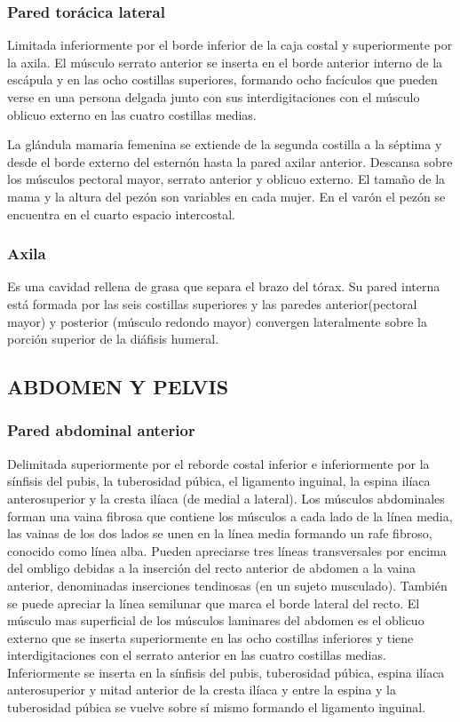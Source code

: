 \documentclass[a4paper,12pt]{article} %
\begin{document}
\begin{appendices}
\subsubsection{Pared torácica lateral}
Limitada inferiormente por el borde inferior de la caja costal y superiormente por la axila.
El músculo serrato anterior se inserta en el borde anterior interno de la escápula y en las ocho costillas superiores, formando ocho facículos que pueden verse en una persona delgada junto con sus interdigitaciones con el músculo oblicuo externo en las cuatro costillas medias.

La glándula mamaria femenina se extiende de la segunda costilla a la séptima y desde el borde externo del esternón hasta la pared axilar anterior. Descansa sobre los músculos  pectoral mayor, serrato anterior y oblicuo externo. El tamaño de la mama y la altura del pezón son variables en cada mujer. En el varón el pezón se encuentra en el cuarto espacio intercostal.
\subsubsection{Axila}
Es una cavidad rellena de grasa que separa el brazo del tórax. Su pared interna está formada por las seis costillas superiores y las paredes anterior(pectoral mayor) y posterior (músculo redondo mayor) convergen lateralmente sobre la porción superior de la diáfisis humeral.


\subsection{ABDOMEN Y PELVIS}

\subsubsection{Pared abdominal anterior}
Delimitada superiormente por el reborde costal inferior e inferiormente por la sínfisis del pubis, la tuberosidad púbica, el ligamento inguinal, la espina ilíaca anterosuperior y la cresta ilíaca (de medial a lateral). Los músculos abdominales forman una vaina fibrosa que contiene los músculos a cada lado de la línea media, las vainas de los dos lados se unen en la línea media formando un rafe fibroso, conocido como línea alba. Pueden apreciarse tres líneas transversales por encima del ombligo debidas a la inserción del recto anterior de abdomen a la vaina anterior, denominadas inserciones tendinosas (en un sujeto musculado). También se puede apreciar la línea semilunar que marca el borde lateral del recto. El músculo mas superficial de los músculos laminares del abdomen es el oblicuo externo que se inserta superiormente en las ocho costillas inferiores y tiene interdigitaciones con el serrato anterior en las cuatro costillas medias. Inferiormente se inserta en la sínfisis del pubis, tuberosidad púbica, espina ilíaca anterosuperior y mitad anterior de la cresta ilíaca y entre la espina y la tuberosidad púbica se vuelve sobre sí mismo formando el ligamento inguinal.


\end{appendices}
\end{document}
